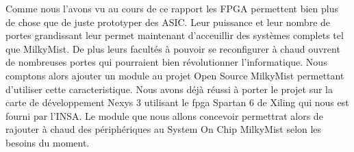 Comme nous l'avons vu au cours de ce rapport les FPGA permettent bien plus de chose que
de juste prototyper des ASIC. Leur puissance et leur nombre de portes grandissant
leur permet maintenant d'acceuillir des systèmes complets tel que MilkyMist. De plus
leurs facultés à pouvoir se reconfigurer à chaud ouvrent de nombreuses portes qui
pourraient bien révolutionner l'informatique. Nous comptons alors ajouter un module
au projet Open Source MilkyMist permettant d'utiliser cette caracteristique. Nous
avons déjà réussi à porter le projet sur la carte de développement Nexys 3 utilisant
le fpga Spartan 6 de Xiling qui nous est fourni par l'INSA. Le module que nous allons
concevoir permettrat alors de rajouter à chaud des périphériques au System On Chip
MilkyMist selon les besoins du moment.

